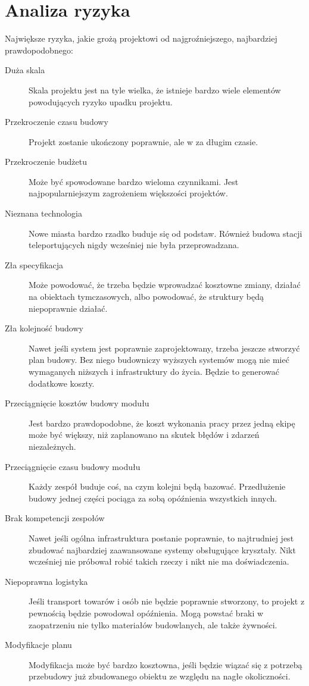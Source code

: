 \section{Analiza ryzyka}
Największe ryzyka, jakie grożą projektowi od najgroźniejszego, najbardziej prawdopodobnego:
\begin{description}
 \item[Duża skala] Skala projektu jest na tyle wielka, że istnieje bardzo wiele elementów powodujących ryzyko upadku projektu.
 \item[Przekroczenie czasu budowy] Projekt zostanie ukończony poprawnie, ale w za długim czasie.
 \item[Przekroczenie budżetu] Może być spowodowane bardzo wieloma czynnikami. Jest najpopularniejszym zagrożeniem większości projektów.
 \item[Nieznana technologia] Nowe miasta bardzo rzadko buduje się od podstaw. Również budowa stacji teleportujących nigdy wcześniej nie była przeprowadzana.
 \item[Zła specyfikacja] Może powodować, że trzeba będzie wprowadzać kosztowne zmiany, działać na obiektach tymczasowych, albo powodować, że struktury będą niepoprawnie działać.
 \item[Zła kolejność budowy] Nawet jeśli system jest poprawnie zaprojektowany, trzeba jeszcze stworzyć plan budowy. Bez niego budowniczy wyższych systemów mogą nie mieć wymaganych niższych i infrastruktury do życia. Będzie to generować dodatkowe koszty.
 \item[Przeciągnięcie kosztów budowy modułu] Jest bardzo prawdopodobne, że koszt wykonania pracy przez jedną ekipę może być większy, niż zaplanowano na skutek błędów i zdarzeń niezależnych.
 \item[Przeciągnięcie czasu budowy modułu] Każdy zespół buduje coś, na czym kolejni będą bazować. Przedłużenie budowy jednej części pociąga za sobą opóźnienia wszystkich innych.
 \item[Brak kompetencji zespołów] Nawet jeśli ogólna infrastruktura postanie poprawnie, to najtrudniej jest zbudować najbardziej zaawansowane systemy obsługujące kryształy. Nikt wcześniej nie próbował robić takich rzeczy i nikt nie ma doświadczenia.
 \item[Niepoprawna logistyka] Jeśli transport towarów i osób nie będzie poprawnie stworzony, to projekt z pewnością będzie powodował opóźnienia. Mogą powstać braki w zaopatrzeniu nie tylko materiałów budowlanych, ale także żywności.
 \item[Modyfikacje planu] Modyfikacja może być bardzo kosztowna, jeśli będzie wiązać się z potrzebą przebudowy już zbudowanego obiektu ze względu na nagłe okoliczności.

\end{description}
